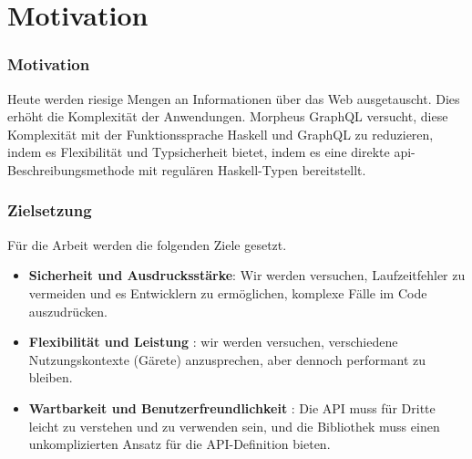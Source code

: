 
\section{Motivation}

\begin{frame}{}
    \frametitle{Motivation}

    Heute werden riesige Mengen an Informationen über das Web ausgetauscht. Dies erhöht die Komplexität der Anwendungen. Morpheus GraphQL versucht, diese Komplexität mit der Funktionssprache Haskell und GraphQL zu reduzieren, indem es Flexibilität und Typsicherheit bietet, indem es eine direkte api-Beschreibungsmethode mit regulären Haskell-Typen bereitstellt. 

\end{frame}

\begin{frame}
    \frametitle{Zielsetzung}

    Für die Arbeit werden die folgenden Ziele gesetzt.    

    \begin{itemize}

        \item \textbf{Sicherheit und Ausdrucksstärke}: Wir werden versuchen, Laufzeitfehler zu vermeiden und es Entwicklern zu ermöglichen, komplexe Fälle im Code auszudrücken.
        
        \item \textbf{Flexibilität und Leistung} : wir werden  versuchen, verschiedene Nutzungskontexte (Gärete) anzusprechen, aber dennoch performant zu bleiben. 
        
        \item \textbf{Wartbarkeit und Benutzerfreundlichkeit}
       :  Die API muss für Dritte leicht zu verstehen und zu verwenden sein, und die Bibliothek muss einen unkomplizierten Ansatz für die API-Definition bieten. 

    \end{itemize}   
\end{frame}

